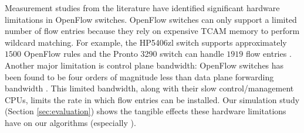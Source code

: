 Measurement studies from the literature \cite{Curtis11,Rotsos12} have identified significant hardware limitations in OpenFlow switches.
OpenFlow switches can only support a limited number of flow entries because they 
rely on expensive TCAM memory to perform wildcard matching.  For example, the HP5406zl switch supports approximately $1500$ OpenFlow rules \cite{Curtis11} and the Pronto 3290 switch
can handle $1919$ flow entries \cite{Ferguson13}. 
Another major limitation is control plane bandwidth: OpenFlow switches has been found to be four orders of magnitude less than data plane 
forwarding bandwidth \cite{Curtis11}. This limited bandwidth, along with their slow control/management CPUs, limits the rate in which flow entries can be installed.  
Our simulation study (Section \ref{sec:evaluation}) shows the tangible effects these hardware limitations have on our algorithms (especially \pcnts).


